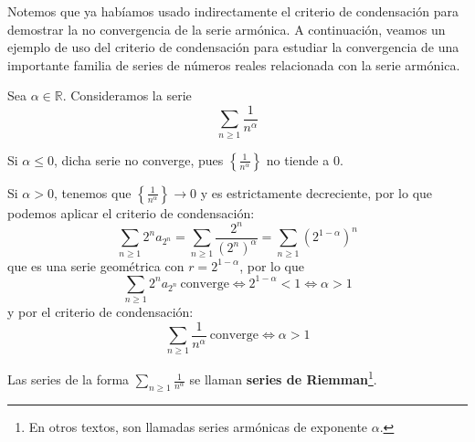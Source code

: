 Notemos que ya habíamos usado indirectamente el criterio de condensación para demostrar la no convergencia de la serie armónica. A continuación, veamos un ejemplo de uso del criterio de condensación para estudiar la convergencia de una importante familia de series de números reales relacionada con la serie armónica.
\begin{ejemplo}
    Sea $\alpha \in \mathbb{R}$. Consideramos la serie
    \begin{equation*}
        \displaystyle\sum_{n \geq 1} \frac{1}{n^{\alpha}}
    \end{equation*}
    
    Si $\alpha \leq 0$, dicha serie no converge, pues $\left\{\frac{1}{n^{\alpha}}\right\}$ no tiende a $0$.
    
    Si $\alpha > 0$, tenemos que $\left\{\frac{1}{n^{\alpha}}\right\} \longrightarrow  0$ y es estrictamente decreciente, por lo que podemos
    aplicar el criterio de condensación:
    \begin{equation*}
        \displaystyle\sum_{n \geq 1} 2^n a_{2^n} = \displaystyle\sum_{n \geq 1} \frac{2^n}{(2^n)^{\alpha}} = \displaystyle\sum_{n \geq 1} (2^{1-\alpha})^n
    \end{equation*}
    que es una serie geométrica con $r = 2^{1-\alpha}$, por lo que
    \begin{equation*}
        \displaystyle\sum_{n \geq 1} 2^n a_{2^n} ~ \text{converge} \Longleftrightarrow 2^{1-\alpha} < 1 \Longleftrightarrow \alpha > 1
    \end{equation*}
    y por el criterio de condensación:
    \begin{equation*}
        \displaystyle\sum_{n \geq 1} \frac{1}{n^{\alpha}} ~ \text{converge} \Longleftrightarrow \alpha > 1
    \end{equation*}
\end{ejemplo}

Las series de la forma $\displaystyle\sum_{n \geq 1} \frac{1}{n^{\alpha}}$ se llaman \textbf{series de Riemman}\footnote{En otros textos,
son llamadas series armónicas de exponente $\alpha$.}.

